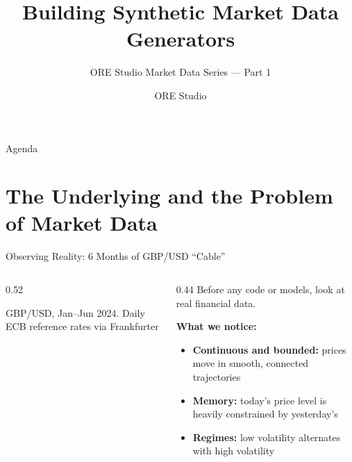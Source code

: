 \documentclass[aspectratio=169,11pt]{beamer}
\title{Building Synthetic Market Data Generators}
\subtitle{ORE Studio Market Data Series --- Part 1}
\author{ORE Studio}
\date{}
\begin{document}
\maketitle

\begin{frame}{Agenda}
  \tableofcontents
\end{frame}

\section{The Underlying and the Problem of Market Data}

\begin{frame}{Observing Reality: 6 Months of GBP/USD ``Cable''}
  \begin{columns}[T]
    \begin{column}{0.52\textwidth}
      \centering

      {\scriptsize GBP/USD, Jan--Jun 2024. Daily ECB reference rates via Frankfurter}
    \end{column}
    \begin{column}{0.44\textwidth}
      \small
      Before any code or models, look at real financial data.
      \medskip

      \textbf{What we notice:}
      \begin{itemize}
        \item \textbf{Continuous and bounded:} prices move in smooth, connected trajectories
        \item \textbf{Memory:} today's price level is heavily constrained by yesterday's
        \item \textbf{Regimes:} low volatility alternates with high volatility
      \end{itemize}
    \end{column}
  \end{columns}
\end{frame}
\end{document}
